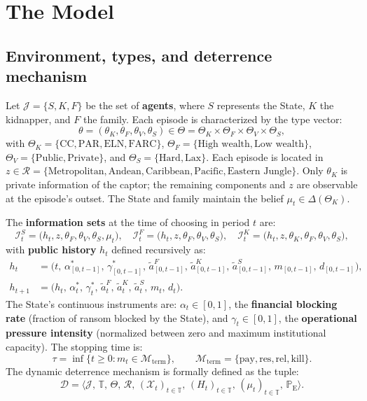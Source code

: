 \documentclass[12pt]{article}
\theoremstyle{definition}
\theoremstyle{remark}
\newcommand{\ProbE}{\mathbb{P}_{\mathrm{E}}}
\newcommand{\1}{\mathbf{1}}
\begin{document}
\section{The Model}
\label{sec:model}

\subsection{Environment, types, and deterrence mechanism}

Let $\mathcal{J}=\{S,K,F\}$ be the set of \textbf{agents}, where $S$ represents the State, $K$ the kidnapper, and $F$ the family. Each episode is characterized by the type vector:
\[
\theta=(\theta_K,\theta_F,\theta_V,\theta_S)\in\Theta=\Theta_K\times\Theta_F\times\Theta_V\times\Theta_S,
\]
with $\Theta_K=\{\text{CC},\text{PAR},\text{ELN},\text{FARC}\}$, $\Theta_F=\{\text{High wealth},\text{Low wealth}\}$, $\Theta_V=\{\text{Public},\text{Private}\}$, and $\Theta_S=\{\text{Hard},\text{Lax}\}$. Each episode is located in $z\in\mathcal{R}=\{\text{Metropolitan}, \text{Andean}, \text{Caribbean}, \text{Pacific}, \text{Eastern Jungle}\}$. Only $\theta_K$ is private information of the captor; the remaining components and $z$ are observable at the episode's outset. The State and family maintain the belief $\mu_t\in\Delta(\Theta_K)$.

The \textbf{information sets} at the time of choosing in period $t$ are:
\[
\mathcal{I}_t^S = \bigl(h_t, z, \theta_F, \theta_V, \theta_S, \mu_t\bigr),\quad
\mathcal{I}_t^F = \bigl(h_t, z, \theta_F, \theta_V, \theta_S\bigr),\quad
\mathcal{I}_t^K = \bigl(h_t, z, \theta_K, \theta_F, \theta_V, \theta_S\bigr),
\]
with \textbf{public history} $h_t$ defined recursively as:
\begin{align}
h_t &= \bigl(t,\, \alpha^\ast_{[0,t-1]},\, \gamma^\ast_{[0,t-1]},\, \tilde{a}^F_{[0,t-1]},\, \tilde{a}^K_{[0,t-1]},\, \tilde{a}^S_{[0,t-1]},\, m_{[0,t-1]},\, d_{[0,t-1]}\bigr),\\
h_{t+1} &= \bigl(h_t,\, \alpha_t^\ast,\, \gamma_t^\ast,\, \tilde{a}_t^F,\, \tilde{a}_t^K,\, \tilde{a}_t^S,\, m_t,\, d_t\bigr).
\end{align}
The State's continuous instruments are: $\alpha_t\in[0,1]$, the \textbf{financial blocking rate} (fraction of ransom blocked by the State), and $\gamma_t\in[0,1]$, the \textbf{operational pressure intensity} (normalized between zero and maximum institutional capacity). The stopping time is:
\[
\tau = \inf \{ t \geq 0 : m_t \in \mathcal{M}_{\mathrm{term}} \},\qquad \mathcal{M}_{\mathrm{term}}=\{\mathrm{pay},\mathrm{res},\mathrm{rel},\mathrm{kill}\}.
\]
The dynamic deterrence mechanism is formally defined as the tuple:
\[
\mathcal{D} = \bigl\langle \mathcal{J},\, \mathbb{T},\, \Theta,\, \mathcal{R},\, (\mathcal{X}_t)_{t \in \mathbb{T}},\, (H_t)_{t \in \mathbb{T}},\, (\mu_t)_{t \in \mathbb{T}},\, \ProbE \bigr\rangle.
\]
\end{document}
